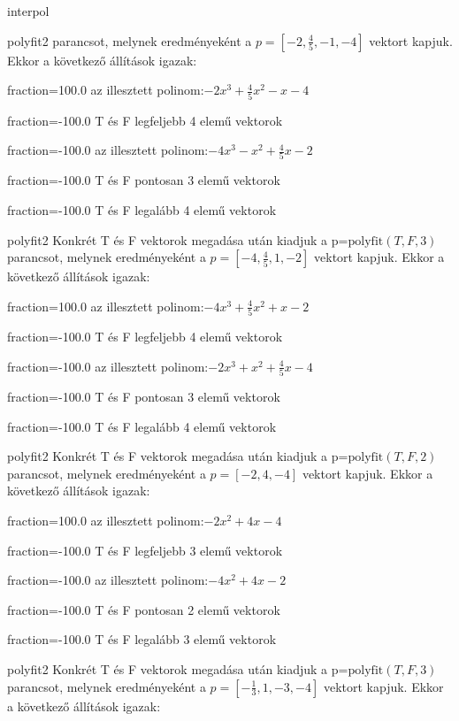 \documentclass[12pt]{article}
\begin{document}
\begin{quiz}{interpol}
\begin{multi}[multiple]{polyfit2}
parancsot, melynek eredményeként a $p=\left[-2,\frac{4}{5},-1,-4\right]$ vektort kapjuk.
Ekkor a következő állítások igazak:
\item[fraction=100.0] az illesztett polinom:$-2x^3+\frac{4}{5}x^2-x-4$
\item[fraction=-100.0]  T és F legfeljebb 4 elemű vektorok
\item[fraction=-100.0]  az illesztett polinom:$-4x^3-x^2+\frac{4}{5}x-2$
\item[fraction=-100.0]  T és F pontosan 3 elemű vektorok
\item[fraction=-100.0] T és F legalább 4 elemű vektorok
\end{multi}
\begin{multi}[multiple]{polyfit2}
Konkrét T és F vektorok megadása után kiadjuk a p=$\mathrm{polyfit}(T,F,3)$
parancsot, melynek eredményeként a $p=\left[-4,\frac{4}{5},1,-2\right]$ vektort kapjuk.
Ekkor a következő állítások igazak:
\item[fraction=100.0] az illesztett polinom:$-4x^3+\frac{4}{5}x^2+x-2$
\item[fraction=-100.0]  T és F legfeljebb 4 elemű vektorok
\item[fraction=-100.0]  az illesztett polinom:$-2x^3+x^2+\frac{4}{5}x-4$
\item[fraction=-100.0]  T és F pontosan 3 elemű vektorok
\item[fraction=-100.0] T és F legalább 4 elemű vektorok
\end{multi}
\begin{multi}[multiple]{polyfit2}
Konkrét T és F vektorok megadása után kiadjuk a p=$\mathrm{polyfit}(T,F,2)$
parancsot, melynek eredményeként a $p=\left[-2,4,-4\right]$ vektort kapjuk.
Ekkor a következő állítások igazak:
\item[fraction=100.0] az illesztett polinom:$-2x^2+4x-4$
\item[fraction=-100.0]  T és F legfeljebb 3 elemű vektorok
\item[fraction=-100.0]  az illesztett polinom:$-4x^2+4x-2$
\item[fraction=-100.0]  T és F pontosan 2 elemű vektorok
\item[fraction=-100.0] T és F legalább 3 elemű vektorok
\end{multi}
\begin{multi}[multiple]{polyfit2}
Konkrét T és F vektorok megadása után kiadjuk a p=$\mathrm{polyfit}(T,F,3)$
parancsot, melynek eredményeként a $p=\left[-\frac{1}{3},1,-3,-4\right]$ vektort kapjuk.
Ekkor a következő állítások igazak:

\end{multi}
\end{quiz}
\end{document}
